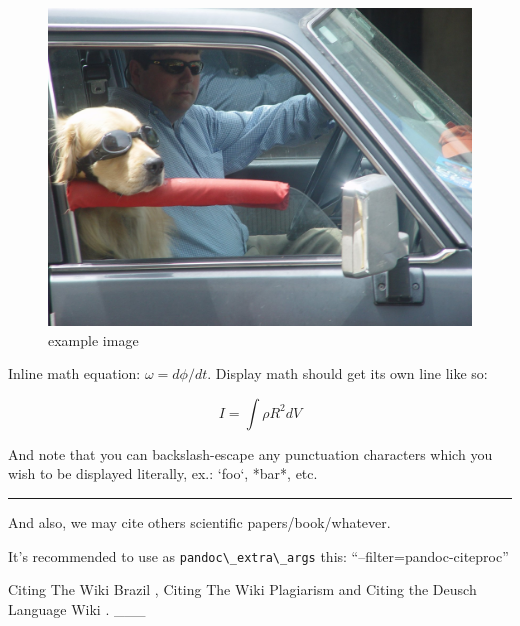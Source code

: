 \documentclass[
  12pt,
  a4paper,
  oneside,tablecaptionabove
]{scrbook}
\newcommand{\passthrough}[1]{#1}
\begin{document}
\begin{figure}
\centering
\includegraphics{example-image.jpg}
\caption{example image}
\end{figure}

Inline math equation: \(\omega = d\phi / dt\). Display math should get
its own line like so:

\[I = \int \rho R^{2} dV\]

And note that you can backslash-escape any punctuation characters which
you wish to be displayed literally, ex.: `foo`, *bar*, etc.

\begin{center}\rule{0.5\linewidth}{\linethickness}\end{center}

And also, we may cite others scientific papers/book/whatever.

It's recommended to use as \passthrough{\lstinline!pandoc\_extra\_args!}
this: ``--filter=pandoc-citeproc''

Citing The Wiki Brazil \textcite{wiki:Brazil}, Citing The Wiki
Plagiarism \autocite{wiki:Plagiarism} and Citing the Deusch Language
Wiki \autocite*{wiki:Deutsch}. \_\_\_



\printbibliography
\end{document}
